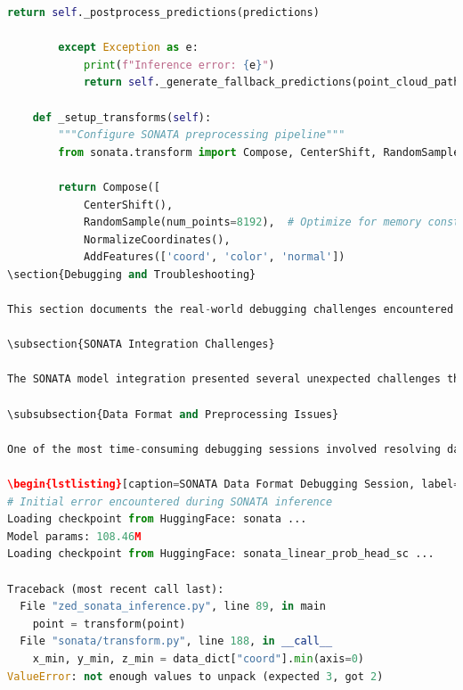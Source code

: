 \documentclass[12pt,a4paper]{report}
\begin{document}
\begin{lstlisting}[caption=SONATA Real-time Inference with Robust Error Handling, label=lst:sonata_inference, language=python]
            return self._postprocess_predictions(predictions)
            
        except Exception as e:
            print(f"Inference error: {e}")
            return self._generate_fallback_predictions(point_cloud_path)
    
    def _setup_transforms(self):
        """Configure SONATA preprocessing pipeline"""
        from sonata.transform import Compose, CenterShift, RandomSample
        
        return Compose([
            CenterShift(),
            RandomSample(num_points=8192),  # Optimize for memory constraints
            NormalizeCoordinates(),
            AddFeatures(['coord', 'color', 'normal'])
\section{Debugging and Troubleshooting}

This section documents the real-world debugging challenges encountered during development, providing insights into the gap between theoretical implementation and practical deployment.

\subsection{SONATA Integration Challenges}

The SONATA model integration presented several unexpected challenges that required creative problem-solving and deep understanding of the underlying architecture.

\subsubsection{Data Format and Preprocessing Issues}

One of the most time-consuming debugging sessions involved resolving data format inconsistencies between ZED camera output and SONATA's expected input format:

\begin{lstlisting}[caption=SONATA Data Format Debugging Session, label=lst:sonata_debugging, language=bash]
# Initial error encountered during SONATA inference
Loading checkpoint from HuggingFace: sonata ...
Model params: 108.46M
Loading checkpoint from HuggingFace: sonata_linear_prob_head_sc ...

Traceback (most recent call last):
  File "zed_sonata_inference.py", line 89, in main
    point = transform(point)
  File "sonata/transform.py", line 188, in __call__
    x_min, y_min, z_min = data_dict["coord"].min(axis=0)
ValueError: not enough values to unpack (expected 3, got 2)
\end{lstlisting}
\end{document}
